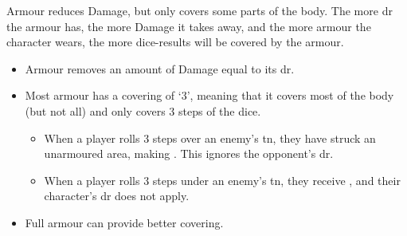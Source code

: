Armour reduces Damage, but only covers some parts of the body.
The more \gls{dr} the armour has, the more Damage it takes away, and the more armour the character wears, the more dice-results will be covered by the armour. 

\begin{itemize}
  \item
  Armour removes an amount of Damage equal to its \gls{dr}.
  \item
  Most armour has a \gls{covering} of `3', meaning that it covers most of the body (but not all) and only covers 3 steps of the dice.
  \begin{itemize}
    \item
    When a player rolls 3 steps over an enemy's \gls{tn}, they have struck an unarmoured area, making .
    This ignores the opponent's \gls{dr}.
    \item
    When a player rolls 3 steps under an enemy's \gls{tn}, they receive , and their character's \gls{dr} does not apply.
  \end{itemize}
  \item
  Full armour can provide better \gls{covering}.
\end{itemize}
